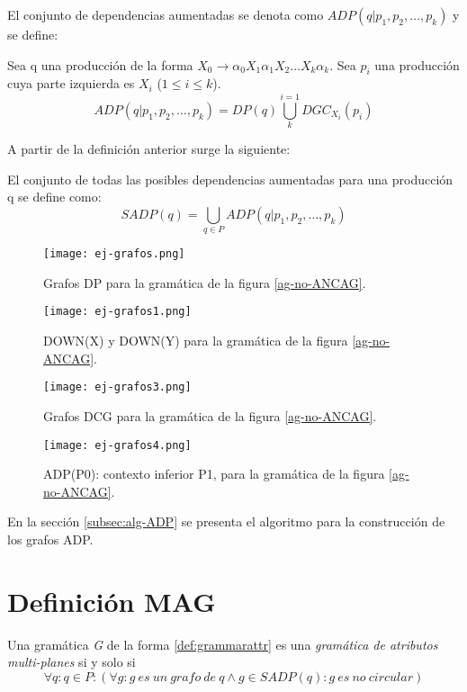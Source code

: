 El conjunto de dependencias aumentadas se denota como $ADP (q | p_{1}, p_{2}, \dots, p_{k})$ y se define:
\begin{definition}
Sea q una producción de la forma $X_{0}\rightarrow \alpha_{0} X_{1} \alpha_{1} X_{2} \dots X_{k} \alpha_{k}$. Sea $p_{i}$ una producción cuya parte izquierda es $X_{i}$ ($1\leqslant i \leqslant k$). 
\begin{equation}
ADP (q | p_{1}, p_{2}, \dots, p_{k}) = DP(q) \bigcup\limits_{k}^{i=1}{DGC_{X_{i}}} (p_{i})
\end{equation}
\end{definition}

A partir de la definición anterior surge la siguiente:
\begin{definition}
El conjunto de todas las posibles dependencias aumentadas para una producción q se define como:
\begin{equation}
SADP(q) = \bigcup\limits_{q\in P}{ADP (q | p_{1}, p_{2}, \dots, p_{k})} 
\end{equation}
\end{definition}

\begin{figure}\centering
 \texttt{[image: ej-grafos.png]}
\caption{\label{dp-wuu-yang}Grafos DP para la gramática de la figura \ref{ag-no-ANCAG}.}
\end{figure}
\begin{figure}\centering
 \texttt{[image: ej-grafos1.png]}
\caption{\label{down-wuu-yang} DOWN(X) y DOWN(Y) para la gramática de la figura \ref{ag-no-ANCAG}.}
\end{figure}

\begin{figure}\centering
 \texttt{[image: ej-grafos3.png]}
\caption{\label{dcg-wuu-yang} Grafos DCG para la gramática de la figura \ref{ag-no-ANCAG}.}
\end{figure}

\begin{figure}\centering
 \texttt{[image: ej-grafos4.png]}
\caption{\label{adp-wuu-yang} ADP(P0): contexto inferior P1, para la gramática de la figura \ref{ag-no-ANCAG}.}
\end{figure}

En la sección \ref{subsec:alg-ADP} se presenta el algoritmo para la construcción de los grafos ADP.

\section{Definición MAG}
\label{def:MAG}
Una gramática \textit{G} de la forma \ref{def:grammarattr} es una \textit{gramática de atributos multi-planes} si y solo si 
\begin{equation}
\forall q : q \in P: (\forall g:g\ es\ un\ grafo\ de\ q \wedge g \in SADP(q) : g\ es\ no\ circular) 
\end{equation}

